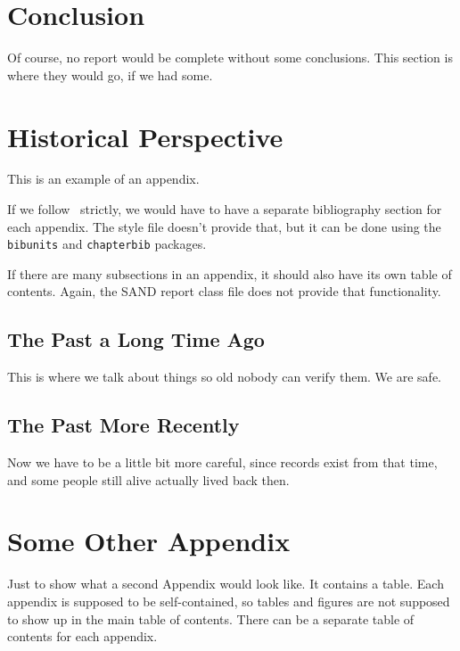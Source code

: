 \documentclass[pdf,ps2pdf,12pt]{SANDreport}
\begin{document}
	



    \section{Conclusion}
	Of course, no report would be complete without some conclusions.
	This section is where they would go, if we had some.

    \nocite{*}


    \clearpage
    \providecommand*{\phantomsection}{}
    \phantomsection
    
    


    \appendix
    \section{Historical Perspective}
	This is an example of an appendix.

	If we follow~\cite{Sand98-0730} strictly, we would have to
	have a separate bibliography section for each appendix.
	The style file doesn't provide that, but it can be done
	using the {\tt bibunits} and {\tt chapterbib} packages.

	If there are many subsections in an appendix, it should also
	have its own table of contents. Again, the SAND report class
	file does not provide that functionality.

	\subsection{The Past a Long Time Ago}
	    This is where we talk about things so old nobody
	    can verify them. We are safe.

	\subsection{The Past More Recently}
	    Now we have to be a little bit more careful, since
	    records exist from that time, and some people still
	    alive actually lived back then.


    \section{Some Other Appendix}
	Just to show what a second Appendix would look like. It contains
	a table. Each appendix is supposed to be self-contained, so
	tables and figures are not supposed to show up in the main
	table of contents. There can be a separate table of contents
	for each appendix.
\end{document}
